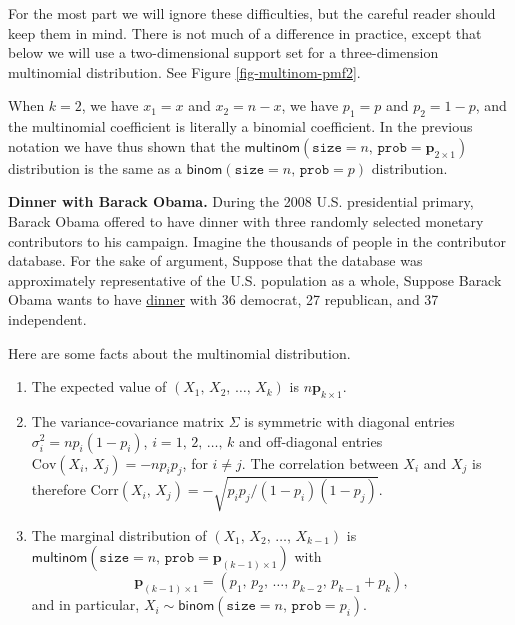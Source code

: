 For the most part we will ignore these difficulties, but the careful
reader should keep them in mind. There is not much of a difference in
practice, except that below we will use a two-dimensional support set
for a three-dimension multinomial distribution. See Figure
\ref{fig-multinom-pmf2}.

When \(k=2\), we have \(x_{1}=x\) and \(x_{2}=n-x\), we have
\(p_{1}=p\) and \(p_{2}=1-p\), and the multinomial coefficient is
literally a binomial coefficient. In the previous notation we have
thus shown that the
\(\mathsf{multinom}(\mathtt{size}=n,\,\mathtt{prob}=\mathbf{p}_{2\times1})\)
distribution is the same as a
\(\mathsf{binom}(\mathtt{size}=n,\,\mathtt{prob}=p)\) distribution.


\textbf{Dinner with Barack Obama.} During the 2008 U.S. presidential primary,
Barack Obama offered to have dinner with three randomly selected
monetary contributors to his campaign. Imagine the thousands of people
in the contributor database. For the sake of argument, Suppose that
the database was approximately representative of the U.S. population
as a whole, Suppose Barack Obama wants to have \href{http://pewresearch.org/pubs/773/fewer-voters-identify-as-republicans}{dinner} with 36
democrat, 27 republican, and 37 independent.


\begin{rem}
Here are some facts about the multinomial distribution.
\begin{enumerate}
\item The expected value of \((X_{1},\, X_{2},\,\ldots,\, X_{k})\) is
\(n\mathbf{p}_{k\times1}\).
\item The variance-covariance matrix \(\Sigma\) is symmetric with
diagonal entries \(\sigma_{i}^{2}=np_{i}(1-p_{i})\),
\(i=1,\,2,\,\ldots,\, k\) and off-diagonal entries
\(\mbox{Cov}(X_{i},\, X_{j})=-np_{i}p_{j}\), for \(i\neq j\). The
correlation between \(X_{i}\) and \(X_{j}\) is therefore
\(\mbox{Corr}(X_{i},\,
   X_{j})=-\sqrt{p_{i}p_{j}/(1-p_{i})(1-p_{j})}\).
\item The marginal distribution of \((X_{1},\, X_{2},\,\ldots,\,
   X_{k-1})\) is
\(\mathsf{multinom}(\mathtt{size}=n,\,\mathtt{prob}=\mathbf{p}_{(k-1)\times1})\)
with
\begin{equation}
\mathbf{p}_{(k-1)\times1}=\left(p_{1},\, p_{2},\,\ldots,\, p_{k-2},\, p_{k-1}+p_{k}\right),
\end{equation}
and in particular,
\(X_{i}\sim\mathsf{binom}(\mathtt{size}=n,\,\mathtt{prob}=p_{i})\).
\end{enumerate}
\end{rem}

